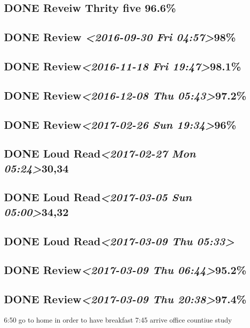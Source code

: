 \documentclass[11pt]{ctexart}
\begin{document}
\subsection{{\bfseries\sffamily DONE} Reveiw Thrity five 96.6\%}
\label{sec:org4f50af3}
\subsection{{\bfseries\sffamily DONE} Review \textit{<2016-09-30 Fri 04:57>}98\%}
\label{sec:org96812eb}
\subsection{{\bfseries\sffamily DONE} Review\textit{<2016-11-18 Fri 19:47>}98.1\%}
\label{sec:orgde78846}
\subsection{{\bfseries\sffamily DONE} Review\textit{<2016-12-08 Thu 05:43>}97.2\%}
\label{sec:org32a3181}
\subsection{{\bfseries\sffamily DONE} Review\textit{<2017-02-26 Sun 19:34>}96\%}
\label{sec:org5e7426e}
\subsection{{\bfseries\sffamily DONE} Loud Read\textit{<2017-02-27 Mon 05:24>}30,34}
\label{sec:org7e21190}
\subsection{{\bfseries\sffamily DONE} Loud Read\textit{<2017-03-05 Sun 05:00>}34,32}
\label{sec:orgbf1605d}
\subsection{{\bfseries\sffamily DONE} Loud Read\textit{<2017-03-09 Thu 05:33>}}
\label{sec:orga4d2429}
\subsection{{\bfseries\sffamily DONE} Review\textit{<2017-03-09 Thu 06:44>}95.2\%}
\label{sec:orgbafa5c7}
\subsection{{\bfseries\sffamily DONE} Review\textit{<2017-03-09 Thu 20:38>}97.4\%}
\label{sec:orgcf1e136}
6:50 go to home in order to have breakfast
7:45 arrive office countiue study
\end{document}
